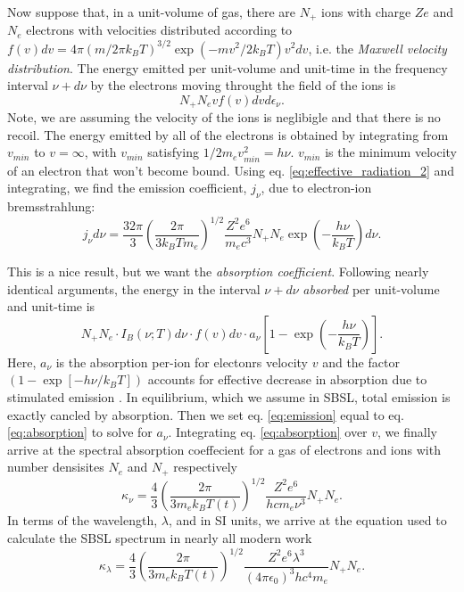 \documentclass[11pt,prb,aps,nofootinbib,superscriptaddress,floatfix]{revtex4-2}
\begin{document}
Now suppose that, in a unit-volume of gas, there are $N_+$ ions with charge $Ze$ and $N_e$ electrons with velocities distributed according to $f(v)dv=4\pi(m/2\pi k_B T)^{3 / 2} \exp(-mv^2 / 2 k_B T) v^2 dv$, i.e. the \emph{Maxwell velocity distribution}. The energy emitted per unit-volume and unit-time in the frequency interval $\nu+d\nu$ by the electrons moving throught the field of the ions is 
\begin{equation}
    N_+ N_e v f(v) dv d\epsilon_\nu.
    \label{eq:emission}
\end{equation}
Note, we are assuming the velocity of the ions is neglibigle and that there is no recoil. The energy emitted by all of the electrons is obtained by integrating from $v_{min}$ to $v=\infty$, with $v_{min}$ satisfying $1/2 m_e v^2_{min}=h\nu$. $v_{min}$ is the minimum velocity of an electron that won't become bound. Using eq. \ref{eq:effective_radiation_2} and integrating, we find the emission coefficient, $j_\nu$, due to electron-ion bremsstrahlung:
\begin{equation}
    j_\nu d \nu=\frac{32\pi}{3}\left( \frac{2\pi}{3k_B T m_e} \right)^{1/2} \frac{Z^2 e^6}{m_e c^3} N_+ N_e \exp\left( -\frac{h\nu}{k_B T} \right)d\nu.
\end{equation}

This is a nice result, but we want the \emph{absorption coefficient}. Following nearly identical arguments, the energy in the interval $\nu+d\nu$ \emph{absorbed} per unit-volume and unit-time is
\begin{equation}
    N_+ N_e \cdot I_B(\nu;T) d\nu \cdot f(v) dv \cdot a_\nu \left[ 1-\exp\left( -\frac{h\nu}{k_B T} \right)\right].
    \label{eq:absorption}
\end{equation}
Here, $a_\nu$ is the absorption per-ion for electonrs velocity $v$ and the factor $(1-\exp[-h\nu/k_B T])$ accounts for effective decrease in absorption due to stimulated emission \cite{zel2002physics}. In equilibrium, which we assume in SBSL, total emission is exactly cancled by absorption. Then we set eq. \ref{eq:emission} equal to eq. \ref{eq:absorption} to solve for $a_\nu$. Integrating eq. \ref{eq:absorption} over $v$, we finally arrive at the spectral absorption coeffecient for a gas of electrons and ions with number densisites $N_e$ and $N_+$ respectively
\begin{equation}
    \kappa_\nu = \frac{4}{3} \left( \frac{2\pi}{3 m_e k_B T(t)} \right)^{1/2} \frac{Z^2 e^6}{h c m_e \nu^3} N_+ N_e .
\end{equation}
In terms of the wavelength, $\lambda$, and in SI units, we arrive at the equation used to calculate the SBSL spectrum in nearly all modern work \cite{hilgenfeldt1999simple,an2006mechanism,an2008spectral,an2009diagnosing}
\begin{equation}
    \kappa_\lambda = \frac{4}{3} \left( \frac{2\pi}{3 m_e k_B T(t)} \right)^{1/2} \frac{Z^2 e^6 \lambda^3}{ (4 \pi \epsilon_0)^3 h c^4 m_e } N_+ N_e .
    \label{eq:absorption_coeff}
\end{equation}
\end{document}
